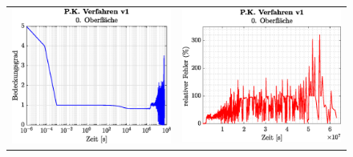 \documentclass{listhesis}
\begin{document}
\begin{figure}[!h]
\begin{tabular}{@{}cc@{}}
\includegraphics[width=\wsss\textwidth]{./include/figure_5.0/PC_current/CovFacet0.eps}&
\includegraphics[width=\wsss\textwidth]{./include/figure_5.0/PC_current/CovFacetError0.eps}\\

\end{tabular}
\end{figure}
\end{document}
